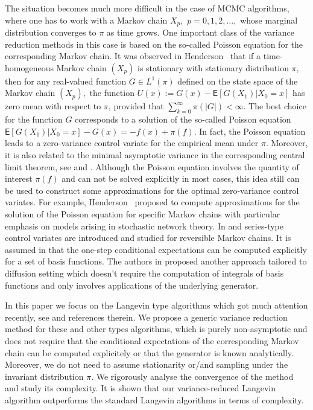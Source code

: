 \documentclass[article]{elsarticle}
\begin{document}
The situation becomes much more difficult in the case of MCMC algorithms, where one  has to work with a
Markov chain \(X_p,\) \(p=0,1,2,\ldots,\) whose marginal distribution  converges  to \(\pi\) as time grows. One important class of the variance reduction methods in this case  is based on the so-called Poisson equation for the corresponding  Markov chain. It was observed in Henderson~\cite{henderson1997variance}  that if a time-homogeneous Markov chain \((X_p)\) is stationary with stationary distribution \(\pi,\) then for any real-valued function \(G \in L^1(\pi) \) defined on the state space of the Markov chain \((X_p),\)  the function \(U(x) := G(x)-\mathsf{E}[G(X_{1})|X_0 = x]\) has zero mean with respect to \(\pi\), provided that \(\sum_{k=0}^\infty \pi(|G|) < \infty\).  The best choice for the function \(G\) corresponds to a solution of the so-called Poisson equation  \(\mathsf{E}[G(X_{1})|X_0 = x]-G(x)=-f(x)+\pi(f)\).  In fact,  the Poisson equation leads to a zero-variance control variate for the empirical mean under \(\pi.\) Moreover, it is also related to the minimal asymptotic variance in the corresponding central limit theorem, see \cite{duncan2016variance} and \cite{mira2013zero}.   Although the Poisson equation involves the quantity of interest \(\pi(f)\)  and can not be  solved explicitly in most cases, this idea still can be used to construct some  approximations for the optimal zero-variance control variates. For example,  Henderson~\cite{henderson1997variance} proposed to compute approximations for the solution of the Poisson equation for specific Markov chains with particular emphasis on models arising in stochastic network theory. In \cite{dellaportas2012control} and \cite{brosse2018diffusion}  series-type control variates are introduced and studied for reversible Markov chains. It is assumed in \cite{dellaportas2012control}  that the one-step conditional expectations  can be computed explicitly  for a set of basis functions. The authors in \cite{brosse2018diffusion} proposed another approach tailored to diffusion setting which doesn't require the computation of integrals of basis functions and only involves  applications of the underlying generator.
\par
In this paper we focus on the  Langevin type algorithms which got much attention recently, see \cite{dalalyan2017theoretical,durmus:moulines:2017} and references therein. We propose  a generic variance reduction method for these and other types algorithms, which is purely non-asymptotic and does not require that    the conditional expectations of the corresponding Markov chain can be computed explicitely or that the generator is known analytically. Moreover, we do not need to assume stationarity or/and sampling under the invariant distribution \(\pi.\) We rigorously analyse the convergence of the method and study its complexity. It is shown that  our variance-reduced Langevin algorithm outperforms the standard Langevin algorithms in terms of complexity.
\end{document}
